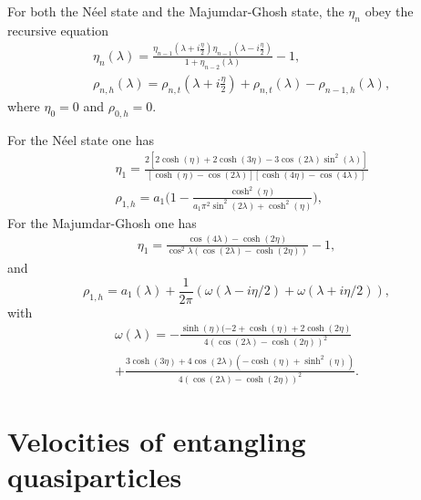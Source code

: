 \documentclass[twocolumn,superscriptaddress,prb,10pt]{revtex4-1}
\begin{document}
For both the N\'eel state and the Majumdar-Ghosh state, the 
$\eta_n$ obey the recursive equation~\cite{ilievski-2015a,brockmann-2014}
%
\begin{align}
\label{eta-rec}
&\eta_n(\lambda)=\frac{\eta_{n-1}(\lambda+i\frac{\eta}{2})
\eta_{n-1}(\lambda-i\frac{\eta}{2})}{1+\eta_{n-2}(\lambda)}-1,\\
\label{rho-rec}
& \rho_{n,h}(\lambda)=\rho_{n,t}(\lambda+i\frac{\eta}{2})+\rho_{n,t}
(\lambda)-\rho_{n-1,h}(\lambda), 
\end{align}
%
where $\eta_0=0$ and $\rho_{0,h}=0$. 

For the N\'eel state one has~\cite{brockmann-2014} 
%
\begin{align}
\label{eta-neel}
& \eta_1=\frac{2[2\cosh(\eta)+2\cosh(3\eta)-3\cos(2\lambda)
\sin^2(\lambda)]}{[\cosh(\eta)-\cos(2\lambda)][\cosh(4\eta)-\cos(4\lambda)]}\\
\nonumber
& \rho_{1,h}=a_1\Big(1-\frac{\cosh^2(\eta)}
{a_1\pi^2\sin^2(2\lambda)+\cosh^2(\eta)}\Big), 
\end{align}
%
For the Majumdar-Ghosh one has~\cite{pozsgay-2014A,mestyan-2015}
%
\begin{align}
\eta_1=\frac{\cos(4\lambda)-\cosh(2\eta)}{\cos^2\lambda(\cos(2\lambda)
-\cosh(2\eta))}-1,
\end{align}
%
and 
%
\begin{equation}
\rho_{1,h}=a_1(\lambda)+\frac{1}{2\pi}(\omega(\lambda-i\eta/2)+\omega(\lambda+i\eta/2)), 
\end{equation}
%
with 
%
\begin{multline}
\omega(\lambda)=-\frac{\sinh(\eta)(-2+\cosh(\eta)+2\cosh(2\eta)}
{4(\cos(2\lambda)-\cosh(2\eta))^2}\\
+\frac{3\cosh(3\eta)+4\cos(2\lambda)(-\cosh(\eta)+\sinh^2(\eta))}
{4(\cos(2\lambda)-\cosh(2\eta))^2}. 
\end{multline}
%

\section{Velocities of entangling quasiparticles}
\label{velocities}
\end{document}
